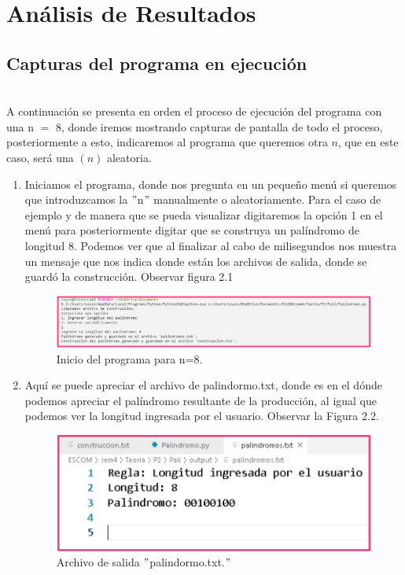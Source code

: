 \chapter{Análisis de Resultados}
\section{Capturas del programa en ejecución}
\\
A continuación se presenta en orden el proceso de ejecución del programa con una n $=$ 8,
donde iremos mostrando capturas de pantalla de todo el proceso, posteriormente a esto, 
indicaremos al programa que queremos otra $n$, que en este caso, será una $(n)$ aleatoria.

\begin{enumerate}
\item Iniciamos el programa, donde nos pregunta en un pequeño menú si queremos que introduzcamos la $"$n$"$ manualmente o aleatoriamente. Para el caso de ejemplo y de manera que se pueda visualizar digitaremos la opción 1 en el menú para posteriormente digitar que se construya un palíndromo de longitud 8. Podemos ver que al finalizar al cabo de milisegundos nos muestra un mensaje que nos indica donde están los archivos de salida, donde se guardó la construcción. Observar figura 2.1\newline


\begin{figure}[h]
\begin{minipage}{0.3\textwidth}
    \includegraphics[width=4\linewidth]{Images/1.png}
\end{minipage}
\caption{Inicio del programa para n=8.}
\label{fig:imagen}
\end{figure}
\newpage
\item Aquí se puede apreciar el archivo de palindormo.txt, donde es en el dónde podemos apreciar el palíndromo resultante de la producción, al igual que podemos ver la longitud ingresada por el usuario.
Observar la Figura 2.2.\newline
\begin{figure}[h]
\begin{minipage}{0.3\textwidth}
    \includegraphics[width=4\linewidth]{Images/2.png}
\end{minipage}
\caption{Archivo de salida $"$palindormo.txt.$"$}
\label{fig:imagen}
\end{figure}


\end{enumerate}
